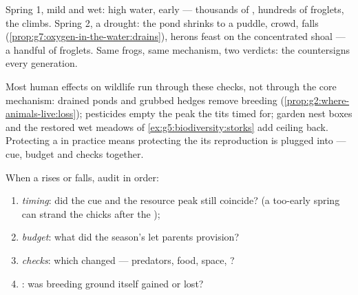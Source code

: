 \begin{example}\label{ex:g8:reproduction-and-environment:twosprings}
Spring 1, mild and wet: high water, early  ---
thousands of , hundreds of froglets, the 
climbs. Spring 2, a drought: the pond shrinks to a
puddle,  crowd,  falls
(\cref{prop:g7:oxygen-in-the-water:drains}), herons
feast on the concentrated shoal --- a handful of
froglets. Same frogs, same mechanism, two verdicts: the
 countersigns every generation.
\end{example}

\begin{remark}\label{rem:g8:reproduction-and-environment:humans}
Most human effects on wildlife run through these checks,
not through the core mechanism: drained ponds and
grubbed hedges remove breeding 
(\cref{prop:g2:where-animals-live:loss}); pesticides
empty the  peak the tits timed for; garden
nest boxes and the restored wet meadows of
\cref{ex:g5:biodiversity:storks} add ceiling back.
Protecting a  in practice means protecting the
 its reproduction is plugged into --- cue,
budget and checks together.
\end{remark}

\begin{method}\label{met:g8:reproduction-and-environment:audit}
When a  rises or falls, audit in order:
\begin{enumerate}
  \item \emph{timing}: did the cue and the resource peak
        still coincide? (a too-early spring can strand
        the chicks after the );
  \item \emph{budget}: what did the season's  let
        parents provision?
  \item \emph{checks}: which changed --- predators, food,
        space, ?
  \item \emph{}: was breeding ground itself gained
        or lost?
\end{enumerate}
\end{method}

